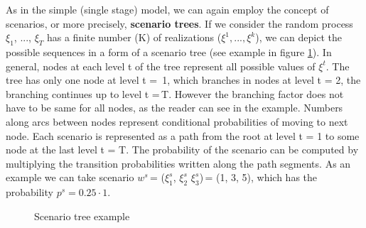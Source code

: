 \documentclass[11pt,a4paper]{article}
\begin{document}
As in the simple (single stage) model, we can again employ the concept of scenarios, or more precisely, \textbf{scenario trees}. If we consider the random process $\xi_1$, ..., $\xi_T$ has a finite number (K) of realizations ($\xi^1,..., \xi^k$), we can depict the possible sequences in a form of a scenario tree (see example in figure \ref{fig:tree}). In general, nodes at each level t of the tree represent all possible values of $\xi^t$. The tree has only one node at level t = \,1, which branches in nodes at level t = 2, the branching continues up to level t =\,T. However the branching factor does not have to be same for all nodes, as the reader can see in the example. Numbers along arcs between nodes represent conditional probabilities of moving to next node.
Each scenario is represented as a path from the root at level t = 1 to some node at the last level t = T. The probability of the scenario can be computed by multiplying the transition probabilities written along the path segments.
As an example we can take scenario $w^s$\,= ($\xi_1^s$, $\xi_2^s$ $\xi_3^s$)\,= (1, 3, 5), which has the probability $p^s = 0.25 \cdot 1$.
\begin{figure}
\caption{Scenario tree example}\label{fig:tree}
\end{figure}
\end{document}
